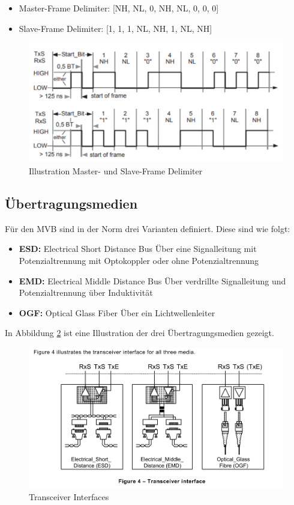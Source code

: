 \begin{itemize}
    \item Master-Frame Delimiter: [NH, NL, 0, NH, NL, 0, 0, 0]
    \item Slave-Frame Delimiter: [1, 1, 1, NL, NH, 1, NL, NH]
\end{itemize}


\begin{figure}[H]
    \centering
    \includegraphics[width=0.8\linewidth]{Figures/Chap2/Grundlagen/Startdelimiter_Master_Start_Norm.png}
    \caption{Illustration Master- und Slave-Frame Delimiter}
    \label{fig:FrameDelimiterMasterSlave}
\end{figure}

\subsection{Übertragungsmedien}
\label{Übertragungsmedien}

Für den MVB sind in der Norm drei Varianten definiert. Diese sind wie folgt:
\begin{itemize}
    \item \textbf{ESD:} Electrical Short Distance Bus
    Über eine Signalleitung mit Potenzialtrennung mit Optokoppler oder ohne Potenzialtrennung
    \item  \textbf{EMD:} Electrical Middle Distance Bus
    Über verdrillte Signalleitung und Potenzialtrennung über Induktivität
    \item  \textbf{OGF:} Optical Glass Fiber
    Über ein Lichtwellenleiter
\end{itemize}

In Abbildung \ref{fig:TransceiverInterface} ist eine Illustration der drei Übertragungsmedien gezeigt. 

\begin{figure}[H]
    \centering
    \includegraphics[width=0.9\linewidth]{Figures/Chap2/Grundlagen/MVB_DOKU/EMD_ESD_OGF/Fig4_Transceiver interface.png}
    \caption{Transceiver Interfaces}
    \label{fig:TransceiverInterface}
\end{figure}

